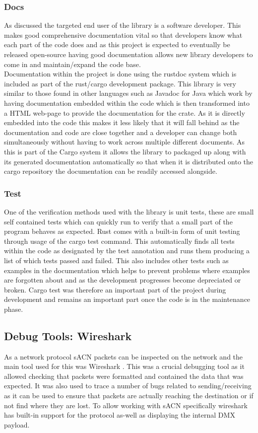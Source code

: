\documentclass[11pt,a4paper]{report}
\begin{document}
\subsubsection{Docs}
As discussed the targeted end user of the library is a software developer. This makes good comprehensive documentation vital so that developers know what each part of the code does and as this project is expected to eventually be released open-source having good documentation allows new library developers to come in and maintain/expand the code base.\\

Documentation within the project is done using the rustdoc system which is included as part of the rust/cargo development package. This library is very similar to those found in other languages such as Javadoc for Java which work by having documentation embedded within the code which is then transformed into a HTML web-page to provide the documentation for the crate. As it is directly embedded into the code this makes it less likely that it will fall behind as the documentation and code are close together and a developer can change both simultaneously without having to work across multiple different documents. As this is part of the Cargo system it allows the library to packaged up along with its generated documentation automatically so that when it is distributed onto the cargo repository the documentation can be readily accessed alongside.

\subsubsection{Test}
One of the verification methods used with the library is unit tests, these are small self contained tests which can quickly run to verify that a small part of the program behaves as expected. Rust comes with a built-in form of unit testing through usage of the cargo test command. This automatically finds all tests within the code as designated by the test annotation and runs them producing a list of which tests passed and failed. This also includes other tests such as examples in the documentation which helps to prevent problems where examples are forgotten about and as the development progresses become depreciated or broken. Cargo test was therefore an important part of the project during development and remains an important part once the code is in the maintenance phase.

\subsection{Debug Tools: Wireshark}
As a network protocol sACN packets can be inspected on the network and the main tool used for this was Wireshark \cite{WIRESHARK}. This was a crucial debugging tool as it allowed checking that packets were formatted and contained the data that was expected. It was also used to trace a number of bugs related to sending/receiving as it can be used to ensure that packets are actually reaching the destination or if not find where they are lost.  To allow working with sACN specifically wireshark has built-in support for the protocol as-well as displaying the internal DMX payload.
\end{document}

